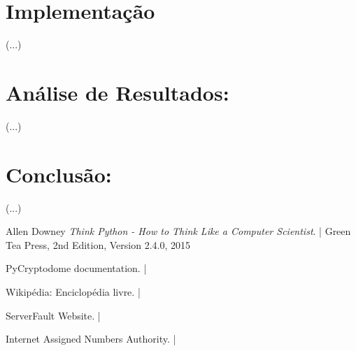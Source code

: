 \clearpage


\chapter{Implementação}	
\label{chap.implementacao}

(...)

%
\chapter{Análise de Resultados:}
\label{chap.analise}

(...)

%
%
\chapter{Conclusão:}
\label{chap.conclusão}

(...)

%
%
\begin{thebibliography}{9}

Allen Downey
\textit{Think Python - How to Think Like a Computer Scientist}. |
Green Tea Press, 2nd Edition, Version 2.4.0, 2015

PyCryptodome documentation. |

Wikipédia: Enciclopédia livre. |

ServerFault Website. |

Internet Assigned Numbers Authority. |


\end{thebibliography}

